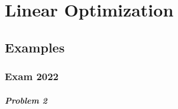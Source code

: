 \chapter{Linear Optimization}
\label{ch:linear-opt}

\section*{Examples}

\subsection*{Exam 2022}
\paragraph{Problem 2}

